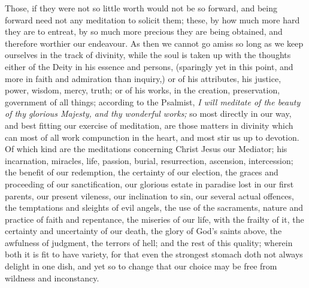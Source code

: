 Those, if they were not so little worth would not be so forward, and being forward need not any meditation to solicit them; these, by how much more hard they are to entreat, by so much more precious they are being obtained, and therefore worthier our endeavour. As then we cannot go amiss so long as we keep ourselves in the track of divinity, while the soul is taken up with the thoughts either of the Deity in his essence and persons, (sparingly yet in this point, and more in faith and admiration than inquiry,) or of his attributes, his justice, power, wisdom, mercy, truth; or of his works, in the creation, preservation, government of all things; according to the Psalmist, \emph{I will meditate of the beauty of thy glorious Majesty, and thy wonderful works;} so most directly in our way, and best fitting our exercise of meditation, are those matters in divinity which can most of all work compunction in the heart, and most stir us up to devotion. Of which kind are the meditations concerning Christ Jesus our Mediator; his incarnation, miracles, life, passion, burial, resurrection, ascension, intercession; the benefit of our redemption, the certainty of our election, the graces and proceeding of our sanctification, our glorious estate in paradise lost in our first parents, our present vileness, our inclination to sin, our several actual offences, the temptations and sleights of evil angels, the use of the sacraments, nature and practice of faith and repentance, the miseries of our life, with the frailty of it, the certainty and uncertainty of our death, the glory of God's saints above, the awfulness of judgment, the terrors of hell; and the rest of this quality; wherein both it is fit to have variety, for that even the strongest stomach doth not always delight in one dish, and yet so to change that our choice may be free from wildness and inconstancy. 

